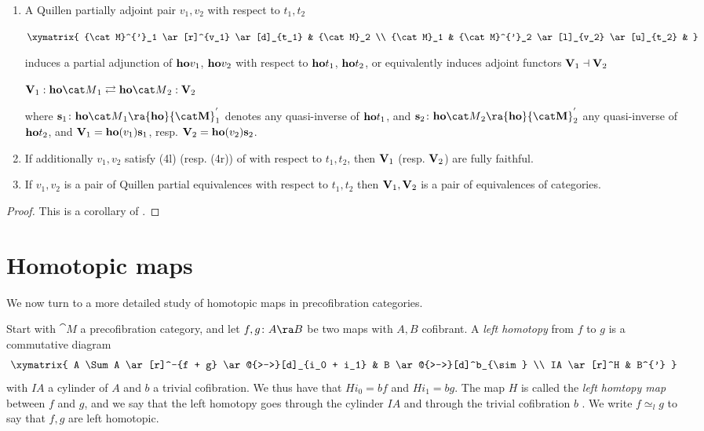 {\begin{thm}
\label{thm:quillenadjoint2}
\mbox{}
\begin{enumerate}
\item
A Quillen partially adjoint pair $v_1, v_2$ with respect to $t_1, t_2$
\begin{center}
$\xymatrix{
    {\cat M}^{'}_1 \ar[r]^{v_1} \ar[d]_{t_1} & {\cat M}_2 \\
    {\cat M}_1 & {\cat M}^{'}_2 \ar[l]_{v_2} \ar[u]_{t_2} &
    }$
\end{center}
induces a partial adjunction of ${\bf ho}v_1$, ${\bf ho}v_2$ with respect to ${\bf ho}t_1$, ${\bf ho}t_2$, or equivalently induces adjoint functors ${\bf V}_1 \dashv {\bf V}_2$
\begin{center}
${\bf V}_1 : {\bf ho}{\cat M}_1 \rightleftarrows {\bf ho}{\cat M}_2 : {\bf V}_2$
\end{center}
where ${\bf s}_1 \colon {\bf ho}{\cat M}_1 \ra {\bf ho}{\cat M}^{'}_1$ denotes any quasi-inverse of ${\bf ho}t_1$, and ${\bf s}_2 \colon {\bf ho}{\cat M}_2 \ra {\bf ho}{\cat M}^{'}_2$ any quasi-inverse of ${\bf ho}t_2$, and ${\bf V}_1 = {\bf ho}(v_1) {\bf s}_1$, resp. ${\bf V}_2 = {\bf ho}(v_2) {\bf s}_2$.
\item
If additionally $v_1, v_2$ satisfy (4l) (resp. (4r)) of  with respect to $t_1, t_2$, then ${\bf V}_1$ (resp. ${\bf V}_2$) are fully faithful.
\item
If $v_1, v_2$ is a pair of Quillen partial equivalences with respect to $t_1, t_2$ then ${\bf V}_1, {\bf V}_2$ is a pair of equivalences of categories.
\end{enumerate}
\end{thm}

\begin{proof}
This is a corollary of .
\end{proof}
} %



\section{Homotopic maps}
\label{chap:homotopicmaps}
We now turn to a more detailed study of homotopic maps in precofibration categories.

Start with ${\cat M}$ a precofibration category, and let $f,g \colon A \ra B$ be two maps with $A, B$ cofibrant. A {\it left homotopy} from $f$ to $g$ is a commutative diagram
\begin{equation}
\label{eqn:lefthomotopy}
\xymatrix{
    A \Sum A \ar[r]^-{f + g} \ar@{>->}[d]_{i_0 + i_1} & B \ar@{>->}[d]^b_{\sim} \\
    IA \ar[r]^H & B^{'}
    }
\end{equation}
with $IA$ a cylinder of $A$ and $b$ a trivial cofibration. We thus have that $Hi_0 = bf$ and $Hi_1 = bg$. The map $H$ is called the {\it left homtopy map} between $f$ and $g$, and we say that the left homotopy goes through the cylinder $IA$ and through the trivial cofibration $b$ . We write $f \simeq_l g$ to say that $f, g$ are left homotopic.

